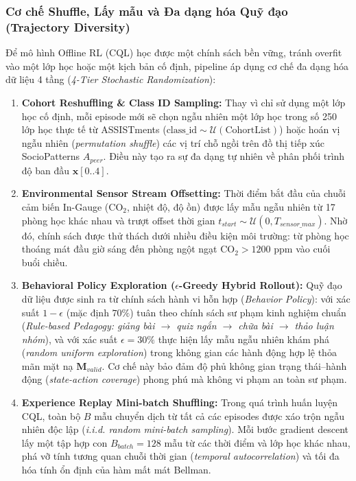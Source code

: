 \subsubsection{Cơ chế Shuffle, Lấy mẫu và Đa dạng hóa Quỹ đạo (Trajectory Diversity)}\label{subsubsec:trajectory-diversity}
Để mô hình Offline RL (CQL) học được một chính sách bền vững, tránh overfit vào một lớp học hoặc một kịch bản cố định, pipeline áp dụng cơ chế đa dạng hóa dữ liệu 4 tầng (\textit{4-Tier Stochastic Randomization}):
\begin{enumerate}[label=\textbf{(\alph*)}]
  \item \textbf{Cohort Reshuffling \& Class ID Sampling:}
  Thay vì chỉ sử dụng một lớp học cố định, mỗi episode mới sẽ chọn ngẫu nhiên một lớp học trong số 250 lớp học thực tế từ ASSISTments ($\text{class\_id} \sim \mathcal{U}(\text{CohortList})$) hoặc hoán vị ngẫu nhiên (\textit{permutation shuffle}) các vị trí chỗ ngồi trên đồ thị tiếp xúc SocioPatterns $A_{peer}$. Điều này tạo ra sự đa dạng tự nhiên về phân phối trình độ ban đầu $\mathbf{x}[0..4]$.
  
  \item \textbf{Environmental Sensor Stream Offsetting:}
  Thời điểm bắt đầu của chuỗi cảm biến In-Gauge ($\text{CO}_2$, nhiệt độ, độ ồn) được lấy mẫu ngẫu nhiên từ 17 phòng học khác nhau và trượt offset thời gian $t_{start} \sim \mathcal{U}(0, T_{sensor\_max})$. Nhờ đó, chính sách được thử thách dưới nhiều điều kiện môi trường: từ phòng học thoáng mát đầu giờ sáng đến phòng ngột ngạt $\text{CO}_2 > 1200\text{ ppm}$ vào cuối buổi chiều.
  
  \item \textbf{Behavioral Policy Exploration ($\epsilon$-Greedy Hybrid Rollout):}
  Quỹ đạo dữ liệu được sinh ra từ chính sách hành vi hỗn hợp (\textit{Behavior Policy}): với xác suất $1 - \epsilon$ (mặc định $70\%$) tuân theo chính sách sư phạm kinh nghiệm chuẩn (\textit{Rule-based Pedagogy: giảng bài $\to$ quiz ngắn $\to$ chữa bài $\to$ thảo luận nhóm}), và với xác suất $\epsilon = 30\%$ thực hiện lấy mẫu ngẫu nhiên khám phá (\textit{random uniform exploration}) trong không gian các hành động hợp lệ thỏa mãn mặt nạ $\mathbf{M}_{valid}$. Cơ chế này bảo đảm độ phủ không gian trạng thái--hành động (\textit{state-action coverage}) phong phú mà không vi phạm an toàn sư phạm.
  
  \item \textbf{Experience Replay Mini-batch Shuffling:}
  Trong quá trình huấn luyện CQL, toàn bộ $B$ mẫu chuyển dịch từ tất cả các episodes được xáo trộn ngẫu nhiên độc lập (\textit{i.i.d. random mini-batch sampling}). Mỗi bước gradient descent lấy một tập hợp con $B_{batch} = 128$ mẫu từ các thời điểm và lớp học khác nhau, phá vỡ tính tương quan chuỗi thời gian (\textit{temporal autocorrelation}) và tối đa hóa tính ổn định của hàm mất mát Bellman.
\end{enumerate}

